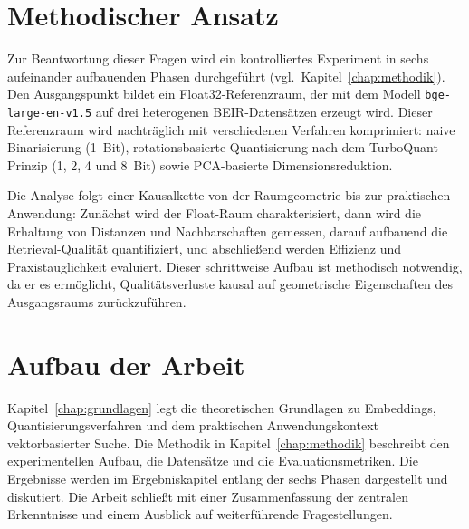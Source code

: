 \section{Methodischer Ansatz}
%
Zur Beantwortung dieser Fragen wird ein kontrolliertes Experiment in sechs aufeinander aufbauenden Phasen durchgeführt (vgl.\ Kapitel~\ref{chap:methodik}).
Den Ausgangspunkt bildet ein Float32-Referenzraum, der mit dem Modell \texttt{bge-large-en-v1.5} \cite{xiao_2023_bge} auf drei heterogenen BEIR-Datensätzen \cite{thakur_2021_beir} erzeugt wird.
Dieser Referenzraum wird nachträglich mit verschiedenen Verfahren komprimiert: naive Binarisierung (1~Bit), rotationsbasierte Quantisierung nach dem TurboQuant-Prinzip (1, 2, 4 und 8~Bit) sowie PCA-basierte Dimensionsreduktion.
\par
Die Analyse folgt einer Kausalkette von der Raumgeometrie bis zur praktischen Anwendung: Zunächst wird der Float-Raum charakterisiert, dann wird die Erhaltung von Distanzen und Nachbarschaften gemessen, darauf aufbauend die Retrieval-Qualität quantifiziert, und abschließend werden Effizienz und Praxistauglichkeit evaluiert.
Dieser schrittweise Aufbau ist methodisch notwendig, da er es ermöglicht, Qualitätsverluste kausal auf geometrische Eigenschaften des Ausgangsraums zurückzuführen.
%
\section{Aufbau der Arbeit}
%
Kapitel~\ref{chap:grundlagen} legt die theoretischen Grundlagen zu Embeddings, Quantisierungsverfahren und dem praktischen Anwendungskontext vektorbasierter Suche.
Die Methodik in Kapitel~\ref{chap:methodik} beschreibt den experimentellen Aufbau, die Datensätze und die Evaluationsmetriken.
Die Ergebnisse werden im Ergebniskapitel entlang der sechs Phasen dargestellt und diskutiert.
Die Arbeit schließt mit einer Zusammenfassung der zentralen Erkenntnisse und einem Ausblick auf weiterführende Fragestellungen.
